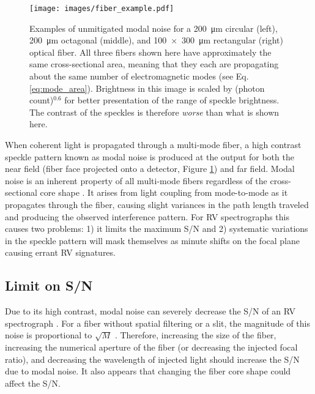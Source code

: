 \documentclass[twocolumn]{emulateapj}
\begin{document}
\begin{figure}
\centering
	\texttt{[image: images/fiber\_example.pdf]}
	\caption{Examples of unmitigated modal noise for a \SI{200}{\micro\meter} circular (left), \SI{200}{\micro\meter} octagonal (middle), and \SI{100x300}{\micro\meter} rectangular (right) optical fiber. All three fibers shown here have approximately the same cross-sectional area, meaning that they each are propagating about the same number of electromagnetic modes (see Eq. \ref{eq:mode_area}). Brightness in this image is scaled by (photon count)$^{0.6}$ for better presentation of the range of speckle brightness. The contrast of the speckles is therefore \textit{worse} than what is shown here.}
\label{fig:fiber_example}
\end{figure}

When coherent light is propagated through a multi-mode fiber, a high contrast speckle pattern known as modal noise is produced at the output for both the near field (fiber face projected onto a detector, Figure \ref{fig:fiber_example}) and far field. Modal noise is an inherent property of all multi-mode fibers regardless of the cross-sectional core shape \citep{Sablowski2015}. It arises from light coupling from mode-to-mode as it propagates through the fiber, causing slight variances in the path length traveled and producing the observed interference pattern. For RV spectrographs this causes two problems: 1) it limits the maximum S/N and 2) systematic variations in the speckle pattern will mask themselves as minute shifts on the focal plane causing errant RV signatures.

\subsection{Limit on S/N}

Due to its high contrast, modal noise can severely decrease the S/N of an RV spectrograph \citep{Epworth1978, Baudrand2001, Lemke2011}. For a fiber without spatial filtering or a slit, the magnitude of this noise is proportional to $\sqrt{M}$ \citep{Goodman1981}. Therefore, increasing the size of the fiber, increasing the numerical aperture of the fiber (or decreasing the injected focal ratio), and decreasing the wavelength of injected light should increase the S/N due to modal noise. It also appears that changing the fiber core shape could affect the S/N.
\end{document}

